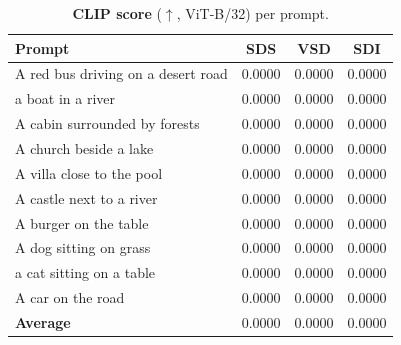 \begin{table}[t]
  \centering
  \footnotesize
  \caption{\textbf{CLIP score} ($\uparrow$, ViT-B/32) per prompt.}
  \label{tab:clip}
  \begin{tabular}{@{}lccc@{}}
    \toprule
    Prompt & SDS & VSD & SDI \\
    \midrule
    A red bus driving on a desert road & 0.0000 & 0.0000 & 0.0000 \\
    a boat in a river                  & 0.0000 & 0.0000 & 0.0000 \\
    A cabin surrounded by forests      & 0.0000 & 0.0000 & 0.0000 \\
    A church beside a lake             & 0.0000 & 0.0000 & 0.0000 \\
    A villa close to the pool          & 0.0000 & 0.0000 & 0.0000 \\
    A castle next to a river           & 0.0000 & 0.0000 & 0.0000 \\
    A burger on the table              & 0.0000 & 0.0000 & 0.0000 \\
    A dog sitting on grass             & 0.0000 & 0.0000 & 0.0000 \\
    a cat sitting on a table           & 0.0000 & 0.0000 & 0.0000 \\
    A car on the road                  & 0.0000 & 0.0000 & 0.0000 \\
    \midrule
    \textbf{Average}                   & 0.0000 & 0.0000 & 0.0000 \\
    \bottomrule
  \end{tabular}
\end{table}
